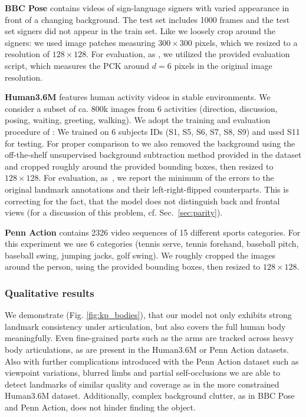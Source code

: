 			\begin{tcolorbox}
				\textbf{BBC Pose} \cite{charles13bbcpose} contains videos of sign-language signers with varied appearance in front of a changing background.
				The test set includes 1000 frames and the test set signers did not appear in the train set.
				Like \cite{jakab18} we loosely crop around the signers: we used image patches measuring $300 \times 300$ pixels, which we resized to a resolution of $128 \times 128$.
				For evaluation, as \cite{jakab18}, we utilized the provided evaluation script, which measures the PCK around $d=6$ pixels in the original image resolution.
			\end{tcolorbox}
			\begin{tcolorbox}
				\textbf{Human3.6M} \cite{ionescu14human36m} features human activity videos in stable environments. We consider a subset of ca. 800k images from 6 activities (direction, discussion, posing, waiting, greeting, walking).
				We adopt the training and evaluation procedure of \cite{zhang18}: We trained on 6 subjects IDs (S1, S5, S6, S7, S8, S9) and used S11 for testing.
				For proper comparison to \cite{zhang18} we also removed the background using the off-the-shelf unsupervised background subtraction method provided in the dataset and cropped roughly around the provided bounding boxes, then resized to $128 \times 128$.
				For evaluation, as~\cite{zhang18}, we report the minimum of the errors to the original landmark annotations and their left-right-flipped counterparts. This is correcting for the fact, that the model does not distinguish back and frontal views (for a discussion of this problem, cf. Sec.~\ref{sec:parity}).
			\end{tcolorbox}
			\begin{tcolorbox}
				\textbf{Penn Action} \cite{zhang13penn} contains 2326 video sequences of 15 different sports categories.
				For this experiment we use 6 categories (tennis serve, tennis forehand, baseball pitch, baseball swing, jumping jacks, golf swing).
				We roughly cropped the images around the person, using the provided bounding boxes, then resized to $128\times128$.
			\end{tcolorbox}

		\subsubsection{Qualitative results}
			We demonstrate (Fig. \ref{fig:kp_bodies}), that our model not only exhibits strong landmark consistency under articulation, but also covers the full human body meaningfully.
			Even fine-grained parts such as the arms are tracked across heavy body articulations, as are present in the Human3.6M or Penn Action datasets.
			Also with further complications introduced with the Penn Action dataset such as viewpoint variations, blurred limbs and partial self-occlusions we are able to detect landmarks of similar quality and coverage as in the more constrained Human3.6M dataset.
			Additionally, complex background clutter, as in BBC Pose and Penn Action, does not hinder finding the object.

